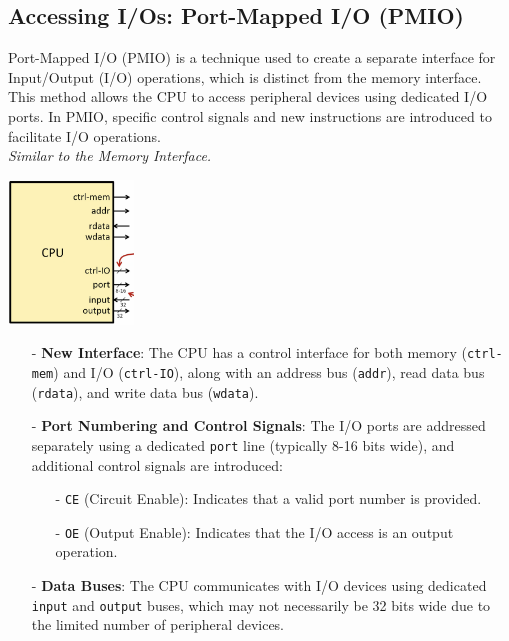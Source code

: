 \subsection{Accessing I/Os: Port-Mapped I/O (PMIO)}
Port-Mapped I/O (PMIO) is a technique used to create a separate interface for Input/Output (I/O) operations, which is distinct from the memory interface. This method allows the CPU to access peripheral devices using dedicated I/O ports. In PMIO, specific control signals and new instructions are introduced to facilitate I/O operations. \\
\textit{Similar to the Memory Interface.}
\begin{center}
    \includegraphics[width=0.25\textwidth]{chapters/chapter2b/images/io.png}
\end{center}
\begin{itemize}
    \item[-] \textbf{New Interface}: The CPU has a control interface for both memory (\texttt{ctrl-mem}) and I/O (\texttt{ctrl-IO}), along with an address bus (\texttt{addr}), read data bus (\texttt{rdata}), and write data bus (\texttt{wdata}).
    \item[-] \textbf{Port Numbering and Control Signals}: The I/O ports are addressed separately using a dedicated \texttt{port} line (typically 8-16 bits wide), and additional control signals are introduced:
    \begin{itemize}
        \item[-] \texttt{CE} (Circuit Enable): Indicates that a valid port number is provided.
        \item[-] \texttt{OE} (Output Enable): Indicates that the I/O access is an output operation.
    \end{itemize}
    \item[-] \textbf{Data Buses}: The CPU communicates with I/O devices using dedicated \texttt{input} and \texttt{output} buses, which may not necessarily be 32 bits wide due to the limited number of peripheral devices.
\end{itemize}
